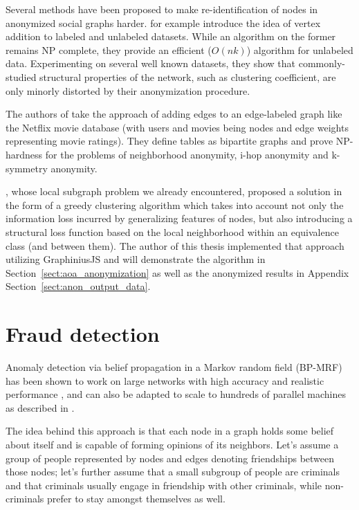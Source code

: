 	Several methods have been proposed to make re-identification of nodes in anonymized social graphs harder.	\cite{chester2011k} for example introduce the idea of vertex addition to labeled and unlabeled datasets. While an algorithm on the former remains NP complete, they provide an efficient ($O(nk)$) algorithm for unlabeled data. Experimenting on several well known datasets, they show that commonly-studied structural properties of the network, such as clustering coefficient, are only minorly distorted by their anonymization procedure.
	
	The authors of \citep{kapron2011social} take the approach of adding edges to an edge-labeled graph like the Netflix movie database (with users and movies being nodes and edge weights representing movie ratings). They define tables as bipartite graphs and prove NP-hardness for the problems of neighborhood anonymity, i-hop anonymity and k-symmetry anonymity.
	
	\cite{campan2009data}, whose local subgraph problem we already encountered, proposed a solution in the form of a greedy clustering algorithm which takes into account not only the information loss incurred by generalizing features of nodes, but also introducing a structural loss function based on the local neighborhood within an equivalence class (and between them). The author of this thesis implemented that approach utilizing GraphiniusJS and will demonstrate the algorithm in Section~\ref{sect:aoa_anonymization} as well as the anonymized results in Appendix Section~\ref{sect:anon_output_data}.		
	
	
	\section{Fraud detection}
	\label{sect:fraud_detection}

	Anomaly detection via belief propagation in a Markov random field (BP-MRF) has been shown to work on large networks with high accuracy and realistic performance \citep{BeliefPropFraudDetection2007}, and can also be adapted to scale to hundreds of parallel machines as described in \citep{BeliefPropBillionNodes2010}.
	
	The idea behind this approach is that each node in a graph holds some belief about itself and is capable of forming opinions of its neighbors. Let's assume a group of people represented by nodes and edges denoting friendships between those nodes; let's further assume that a small subgroup of people are criminals and that criminals usually engage in friendship with other criminals, while non-criminals prefer to stay amongst themselves as well. 
	
